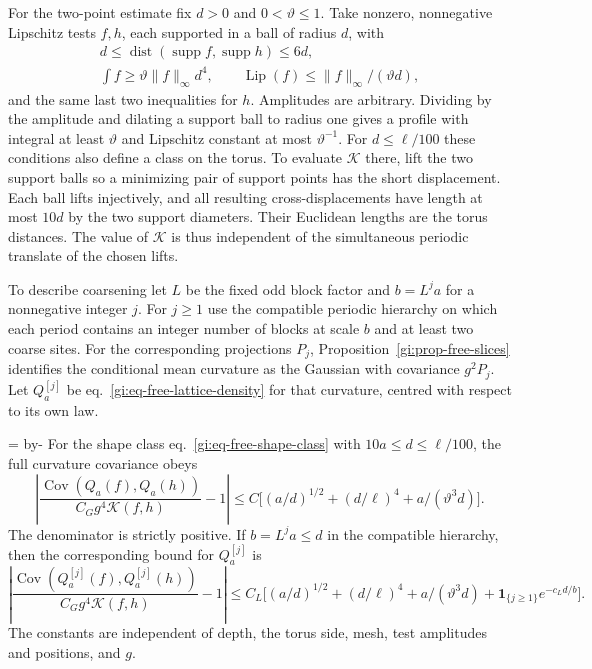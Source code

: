 \documentclass[11pt,letterpaper,reqno]{amsart}
\makeatletter
\numberwithin{equation}{section}
\renewcommand{\eqref}[1]{\textup{eq.~\ref{#1}}}
\newcommand{\gineedspace}[1]{\par\begingroup
  \dimen0=\pagegoal\advance\dimen0 by-\pagetotal
  \ifdim\dimen0<#1\relax\newpage\fi\endgroup}
\theoremstyle{definition}
\newcommand{\ms@majorstart}{%
  \pushQED{\qed}\renewcommand{\qedsymbol}{$\blacksquare\square$}}
\newenvironment{theorem}[1][]{\ms@majorstart\ms@theorem[#1]}
  {\popQED\endms@theorem}
\theoremstyle{remark}
\makeatother
\begin{document}
For the two-point estimate fix \(d>0\) and \(0<\vartheta\le1\).
Take nonzero, nonnegative Lipschitz tests \(f,h\), each
supported in a ball of radius \(d\), with
\begin{equation}\label{gi:eq-free-shape-class}
 \begin{gathered}
 d\le\operatorname{dist}(\operatorname{supp} f,
                            \operatorname{supp} h)\le6d,\\
 \int f\ge\vartheta\|f\|_\infty d^4,\qquad
 \operatorname{Lip}(f)\le\|f\|_\infty/(\vartheta d),
 \end{gathered}
\end{equation}
and the same last two inequalities for \(h\).
Amplitudes are arbitrary. Dividing by the amplitude and
dilating a support ball to radius one gives a profile with
integral at least \(\vartheta\) and Lipschitz constant at
most \(\vartheta^{-1}\). For \(d\le\ell/100\) these conditions
also define a class on the torus. To evaluate \(\mathcal K\)
there, lift the two support balls so a minimizing pair of
support points has the short displacement. Each ball lifts
injectively, and all resulting cross-displacements have
length at most \(10d\) by the two support diameters.
Their Euclidean lengths are the torus distances. The value
of \(\mathcal K\) is thus independent of the simultaneous
periodic translate of the chosen lifts.

To describe coarsening let \(L\) be the fixed odd block factor
and \(b=L^j a\) for a nonnegative integer \(j\).
For \(j\ge1\) use the compatible periodic hierarchy on which
each period contains an integer number of blocks at scale
\(b\) and at least two coarse sites.
For the corresponding projections \(P_j\),
Proposition~\ref{gi:prop-free-slices} identifies the
conditional mean curvature as the Gaussian with covariance
\(g^2P_j\).
Let \(Q_a^{[j]}\) be \eqref{gi:eq-free-lattice-density} for
that curvature, centred with respect to its own law.

\gineedspace{15\baselineskip}
\begin{theorem}[The uniform separated two-point comparison]
\label{gi:thm-free-separated-comparison}
For the shape class \eqref{gi:eq-free-shape-class} with
\(10a\le d\le\ell/100\), the full curvature covariance obeys
\[
 \left|
 \frac{\operatorname{Cov}(Q_a(f),Q_a(h))}
             {C_Gg^4\mathcal K(f,h)}-1
 \right|
 \le C\bigl[(a/d)^{1/2}+(d/\ell)^4+a/(\vartheta^3 d)\bigr].
\]
The denominator is strictly positive.
If \(b=L^j a\le d\) in the compatible hierarchy, then the
corresponding bound for \(Q_a^{[j]}\) is
\begin{equation}\label{gi:eq-free-background-error}
 \left|
 \frac{\operatorname{Cov}(Q_a^{[j]}(f),Q_a^{[j]}(h))}
             {C_Gg^4\mathcal K(f,h)}-1
 \right|
 \le C_L\bigl[(a/d)^{1/2}+(d/\ell)^4+a/(\vartheta^3 d)
                           +\mathbf 1_{\{j\ge1\}}e^{-c_Ld/b}\bigr].
\end{equation}
The constants are independent of depth, the torus side, mesh,
test amplitudes and positions, and \(g\).
\end{theorem}
\end{document}
